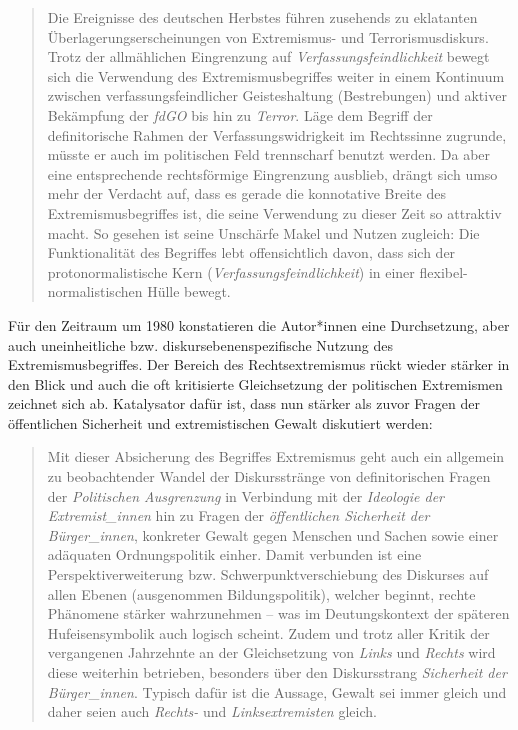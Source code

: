 \begin{quote}
Die Ereignisse des deutschen Herbstes führen zusehends zu eklatanten Überlagerungserscheinungen von Extremismus- und Terrorismusdiskurs. Trotz der allmählichen Eingrenzung auf \emph{Verfassungsfeindlichkeit} bewegt sich die Verwendung des Extremismusbegriffes weiter in einem Kontinuum zwischen verfassungsfeindlicher Geisteshaltung (Bestrebungen) und aktiver Bekämpfung der \emph{fdGO} bis hin zu \emph{Terror}. Läge dem Begriff der definitorische Rahmen der Verfassungswidrigkeit im Rechtssinne zugrunde, müsste er auch im politischen Feld trennscharf benutzt werden. Da aber eine entsprechende rechtsförmige Eingrenzung ausblieb, drängt sich umso mehr der Verdacht auf, dass es gerade die konnotative Breite des Extremismusbegriffes ist, die seine Verwendung zu dieser Zeit so attraktiv macht. So gesehen ist seine Unschärfe Makel und Nutzen zugleich: Die Funktionalität des Begriffes lebt offensichtlich davon, dass sich der protonormalistische Kern (\emph{Verfassungsfeindlichkeit}) in einer flexibel-normalistischen Hülle bewegt. \autocite[144]{ackermannMetamorphosenExtremismusbegriffesDiskursanalytische2015}
\end{quote}

Für den Zeitraum um 1980 konstatieren die Autor*innen eine Durchsetzung, aber auch uneinheitliche bzw. diskursebenenspezifische Nutzung des Extremismusbegriffes. Der Bereich des Rechtsextremismus rückt wieder stärker in den Blick und auch die oft kritisierte Gleichsetzung der politischen Extremismen zeichnet sich ab. Katalysator dafür ist, dass nun stärker als zuvor Fragen der öffentlichen Sicherheit und extremistischen Gewalt diskutiert werden:

\begin{quote}
Mit dieser Absicherung des Begriffes Extremismus geht auch ein allgemein zu beobachtender Wandel der Diskursstränge von definitorischen Fragen der \emph{Politischen Ausgrenzung} in Verbindung mit der \emph{Ideologie der Extremist\_innen} hin zu Fragen der \emph{öffentlichen Sicherheit der Bürger\_innen}, konkreter Gewalt gegen Menschen und Sachen sowie einer adäquaten Ordnungspolitik einher. Damit verbunden ist eine Perspektiverweiterung bzw. Schwerpunktverschiebung des Diskurses auf allen Ebenen (ausgenommen Bildungspolitik), welcher beginnt, rechte Phänomene stärker wahrzunehmen -- was im Deutungskontext der späteren Hufeisensymbolik auch logisch scheint. Zudem und trotz aller Kritik der vergangenen Jahrzehnte an der Gleichsetzung von \emph{Links} und \emph{Rechts} wird diese weiterhin betrieben, besonders über den Diskursstrang \emph{Sicherheit der Bürger\_innen}. Typisch dafür ist die Aussage, Gewalt sei immer gleich und daher seien auch \emph{Rechts-} und \emph{Linksextremisten} gleich. \autocite[162-163]{ackermannMetamorphosenExtremismusbegriffesDiskursanalytische2015}
\end{quote}

